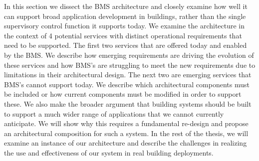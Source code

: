 
In this section we dissect the BMS architecture and closely examine how well it can support broad application development
in buildings, rather than the single supervisory control function it supports today.  We examine the architecture in the context
of 4 potential services with distinct operational requirements that need to be supported.  The first two services that 
are offered today and enabled by the BMS.  We describe how emerging requirements are driving the evolution of these
services and how BMS's are struggling to meet the new requirements due to limitations in their architectural design.
The next two are emerging services that BMS's cannot support today.  We describe which architectural components must be included
or how current components must be modified in order to support these.  We also make the broader argument that 
building systems should be built to support a much wider range of applications that we cannot currently anticipate.
We will show why this requires a fundamental re-design and propose an architectural composition for such a system.
In the rest of the thesis, we will examine an instance of our architecture and describe the challenges in realizing
the use and effectiveness of our system in real building deployments.



